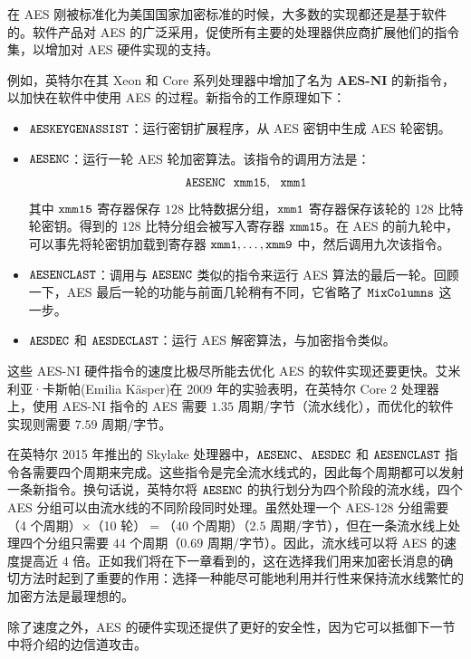 \begin{snote}[AES的硬件实现。]
在 AES 刚被标准化为美国国家加密标准的时候，大多数的实现都还是基于软件的。软件产品对 AES 的广泛采用，促使所有主要的处理器供应商扩展他们的指令集，以增加对 AES 硬件实现的支持。

例如，英特尔在其 Xeon 和 Core 系列处理器中增加了名为 \textbf{AES-NI} 的新指令，以加快在软件中使用 AES 的过程。新指令的工作原理如下：
\begin{itemize}
	\item $\tt{AESKEYGENASSIST}$：运行密钥扩展程序，从 AES 密钥中生成 AES 轮密钥。
	\item $\tt{AESENC}$：运行一轮 AES 轮加密算法。该指令的调用方法是：
	$$
    \tt{AESENC~~xmm15,~~xmm1}
    $$
    其中 $\tt xmm15$ 寄存器保存 $128$ 比特数据分组，$\tt xmm1$ 寄存器保存该轮的 $128$ 比特轮密钥。得到的 $128$ 比特分组会被写入寄存器 $\tt xmm15$。在 AES 的前九轮中，可以事先将轮密钥加载到寄存器 $\tt{xmm1,\dots,xmm9}$ 中，然后调用九次该指令。
    \item $\tt AESENCLAST$：调用与 $\tt AESENC$ 类似的指令来运行 AES 算法的最后一轮。回顾一下，AES 最后一轮的功能与前面几轮稍有不同，它省略了 $\tt MixColumns$ 这一步。
    \item $\tt AESDEC$ 和 $\tt AESDECLAST$：运行 AES 解密算法，与加密指令类似。
\end{itemize}
这些 AES-NI 硬件指令的速度比极尽所能去优化 AES 的软件实现还要更快。艾米利亚·卡斯帕(Emilia Käsper)在 2009 年的实验表明，在英特尔 Core 2 处理器上，使用 AES-NI 指令的 AES 需要 $1.35$ 周期/字节（流水线化），而优化的软件实现则需要 $7.59$ 周期/字节。

在英特尔 2015 年推出的 Skylake 处理器中，$\tt AESENC$、$\tt AESDEC$ 和 $\tt AESENCLAST$ 指令各需要四个周期来完成。这些指令是完全流水线式的，因此每个周期都可以发射一条新指令。换句话说，英特尔将 $\tt AESENC$ 的执行划分为四个阶段的流水线，四个 AES 分组可以由流水线的不同阶段同时处理。虽然处理一个 AES-128 分组需要（4 个周期）$\times$（10 轮）$=$（$40$ 个周期）（$2.5$ 周期/字节），但在一条流水线上处理四个分组只需要 $44$ 个周期（$0.69$ 周期/字节）。因此，流水线可以将 AES 的速度提高近 $4$ 倍。正如我们将在下一章看到的，这在选择我们用来加密长消息的确切方法时起到了重要的作用：选择一种能尽可能地利用并行性来保持流水线繁忙的加密方法是最理想的。

除了速度之外，AES 的硬件实现还提供了更好的安全性，因为它可以抵御下一节中将介绍的边信道攻击。
\end{snote}